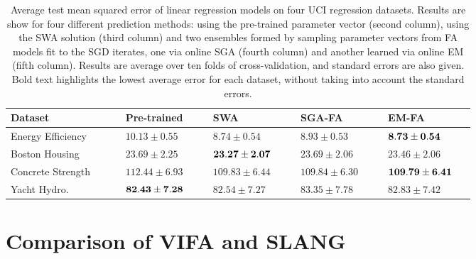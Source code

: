 \documentclass[msc,deptreport.inf]{infthesis} %
\begin{document}
 \begin{table}[h!]
	\begin{center}
		\begin{tabular}{|| p{0.21\linewidth} p{0.16\linewidth} p{0.16\linewidth} p{0.16\linewidth} p{0.16\linewidth} ||} 
 			\hline
 			Dataset & Pre-trained & SWA & SGA-FA & EM-FA \\ [0.5ex] 
 			\hline\hline
			Energy Efficiency & $10.13 \pm 0.55$ & $8.74 \pm 0.54$ & $8.93 \pm 0.53$ & $\bf{8.73 \pm 0.54}$ \\
			Boston Housing & $23.69 \pm 2.25$ & $\bf{23.27 \pm 2.07}$ & $23.69 \pm 2.06$ & $23.46 \pm 2.06$ \\
			Concrete Strength & $112.44 \pm 6.93$ & $109.83 \pm 6.44$ & $109.84 \pm 6.30$ & $\bf{109.79 \pm 6.41}$ \\
			Yacht Hydro. & $\bf{82.43 \pm 7.28}$ & $82.54 \pm 7.27$ & $83.35 \pm 7.78$ & $82.83 \pm 7.42$ \\ [1ex] 
			\hline
		\end{tabular}
		\caption{Average test mean squared error of linear regression models on four UCI regression datasets. Results are show for four different prediction methods: using the pre-trained parameter vector (second column), using the SWA solution (third column) and two ensembles formed by sampling parameter vectors from FA models fit to the SGD iterates, one via online SGA (fourth column) and another learned via online EM (fifth column). Results are average over ten folds of cross-validation, and standard errors are also given. Bold text highlights the lowest average error for each dataset, without taking into account the standard errors.}
		\label{table:linear_regression_mse}
	\end{center}
\end{table}


\section{Comparison of VIFA and SLANG}
\end{document}
